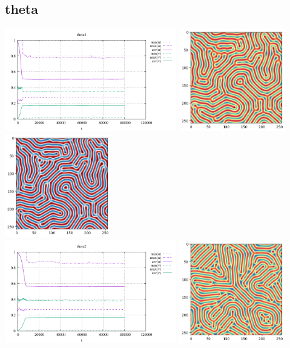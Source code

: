 \subsection*{theta}
\begin{center}
\includegraphics[height=4.5cm]{python_codes/fieldstone_171/results/theta1_stats}
\includegraphics[height=4.5cm]{python_codes/fieldstone_171/results/theta1_solution_final_u.png}
\includegraphics[height=4.5cm]{python_codes/fieldstone_171/results/theta1_solution_final_v.png}\\
\includegraphics[height=4.5cm]{python_codes/fieldstone_171/results/theta2_stats}
\includegraphics[height=4.5cm]{python_codes/fieldstone_171/results/theta2_solution_final_u.png}

\end{center}
